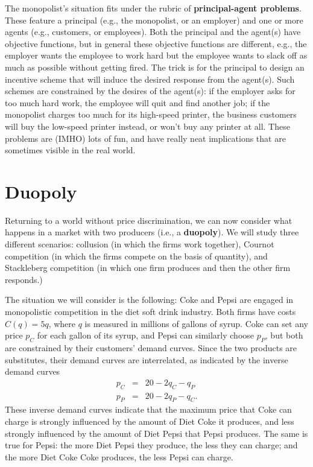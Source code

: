 The monopolist's situation fits under the rubric of \textbf{principal-agent problems}. These feature a principal (e.g., the monopolist, or an employer) and one or more agents (e.g., customers, or employees). Both the principal and the agent(s) have objective functions, but in general these objective functions are different, e.g., the employer wants the employee to work hard but the employee wants to slack off as much as possible without getting fired. The trick is for the principal to design an incentive scheme that will induce the desired response from the agent(s). Such schemes are constrained by the desires of the agent(s): if the employer asks for too much hard work, the employee will quit and find another job; if the monopolist charges too much for its high-speed printer, the business customers will buy the low-speed printer instead, or won't buy any printer at all. These problems are (IMHO) lots of fun, and have really neat implications that are sometimes visible in the real world.


\section{Duopoly}

Returning to a world without price discrimination, we can now consider what happens in a market with two producers (i.e., a \textbf{duopoly}). We will study three different scenarios: collusion (in which the firms work together), Cournot competition (in which the firms compete on the basis of quantity), and Stackleberg competition (in which one firm produces and then the other firm responds.)

The situation we will consider is the following: Coke and Pepsi are engaged in monopolistic competition in the diet soft drink industry. Both firms have costs $C(q)=5q$, where $q$ is measured in millions of gallons of syrup. Coke can set any price $p_C$ for each gallon of its syrup, and Pepsi can similarly choose $p_P$, but both are constrained by their customers' demand curves. Since the two products are substitutes, their demand curves are interrelated, as indicated by the inverse demand curves
\begin{eqnarray*}
p_C & = & 20-2q_C-q_P\\
p_P & = & 20-2q_P-q_C.
\end{eqnarray*}
These inverse demand curves indicate that the maximum price that Coke can charge is strongly influenced by the amount of Diet Coke it produces, and less strongly influenced by the amount of Diet Pepsi that Pepsi produces. The same is true for Pepsi: the more Diet Pepsi they produce, the less they can charge; and the more Diet Coke Coke produces, the less Pepsi can charge.

